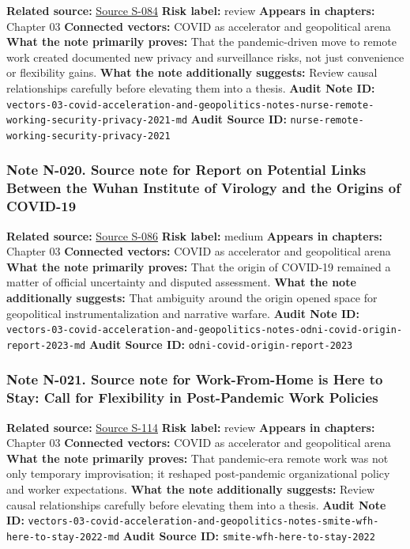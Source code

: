 \documentclass[
  american,
  11pt,
  letterpaper,
]{article}
\begin{document}
\textbf{Related source:}
\hyperref[source-s-084-remote-working-pre-and-post-covid-19-an-analysis-of-new-threats-and-risks-to-security-and-privacy]{Source
S-084} \textbf{Risk label:} review \textbf{Appears in chapters:} Chapter
03 \textbf{Connected vectors:} COVID as accelerator and geopolitical
arena \textbf{What the note primarily proves:} That the pandemic-driven
move to remote work created documented new privacy and surveillance
risks, not just convenience or flexibility gains. \textbf{What the note
additionally suggests:} Review causal relationships carefully before
elevating them into a thesis. \textbf{Audit Note ID:}
\texttt{vectors-03-covid-acceleration-and-geopolitics-notes-nurse-remote-working-security-privacy-2021-md}
\textbf{Audit Source ID:}
\texttt{nurse-remote-working-security-privacy-2021}

\subsubsection{Note N-020. Source note for Report on Potential Links
Between the Wuhan Institute of Virology and the Origins of
COVID-19}\label{note-n-020-vectors-03-covid-acceleration-and-geopolitics-notes-odni-covid-origin-report-2023-md}

\textbf{Related source:}
\hyperref[source-s-086-report-on-potential-links-between-the-wuhan-institute-of-virology-and-the-origins-of-covid-19]{Source
S-086} \textbf{Risk label:} medium \textbf{Appears in chapters:} Chapter
03 \textbf{Connected vectors:} COVID as accelerator and geopolitical
arena \textbf{What the note primarily proves:} That the origin of
COVID-19 remained a matter of official uncertainty and disputed
assessment. \textbf{What the note additionally suggests:} That ambiguity
around the origin opened space for geopolitical instrumentalization and
narrative warfare. \textbf{Audit Note ID:}
\texttt{vectors-03-covid-acceleration-and-geopolitics-notes-odni-covid-origin-report-2023-md}
\textbf{Audit Source ID:} \texttt{odni-covid-origin-report-2023}

\subsubsection{Note N-021. Source note for Work-From-Home is Here to
Stay: Call for Flexibility in Post-Pandemic Work
Policies}\label{note-n-021-vectors-03-covid-acceleration-and-geopolitics-notes-smite-wfh-here-to-stay-2022-md}

\textbf{Related source:}
\hyperref[source-s-114-work-from-home-is-here-to-stay-call-for-flexibility-in-post-pandemic-work-policies]{Source
S-114} \textbf{Risk label:} review \textbf{Appears in chapters:} Chapter
03 \textbf{Connected vectors:} COVID as accelerator and geopolitical
arena \textbf{What the note primarily proves:} That pandemic-era remote
work was not only temporary improvisation; it reshaped post-pandemic
organizational policy and worker expectations. \textbf{What the note
additionally suggests:} Review causal relationships carefully before
elevating them into a thesis. \textbf{Audit Note ID:}
\texttt{vectors-03-covid-acceleration-and-geopolitics-notes-smite-wfh-here-to-stay-2022-md}
\textbf{Audit Source ID:} \texttt{smite-wfh-here-to-stay-2022}
\end{document}
